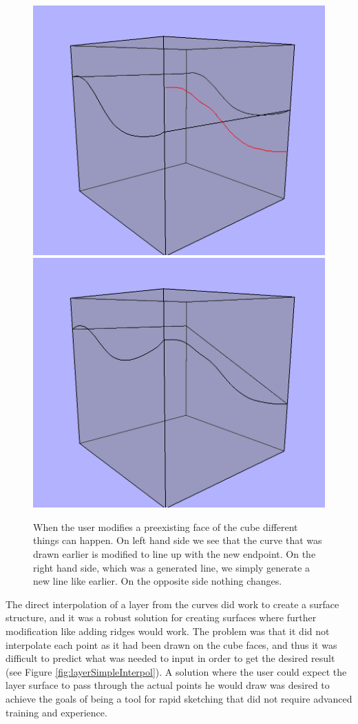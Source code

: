 \documentclass[a4paper,12pt]{report}
\begin{document}
\begin{figure}
\includegraphics[width=.5\linewidth]{thesis/modification1.png}
\includegraphics[width=.5\linewidth]{thesis/modification2.png}
 \caption{When the user modifies a preexisting face of the cube different things can happen. On left hand side we see that the curve that was drawn earlier is modified to line up with the new endpoint. On the right hand side, which was a generated line, we simply generate a new line like earlier. On the opposite side nothing changes.}
 \label{fig:layerModify}
\end{figure}


The direct interpolation of a layer from the curves did work to create a surface structure, and it was a robust solution for creating surfaces where further modification like adding ridges would work. The problem was that it did not interpolate each point as it had been drawn on the cube faces, and thus it was difficult to predict what was needed to input in order to get the desired result (see Figure \ref{fig:layerSimpleInterpol}). A solution where the user could expect the layer surface to pass through the actual points he would draw was desired to achieve the goals of being a tool for rapid sketching that did not require advanced training and experience.
\end{document}
